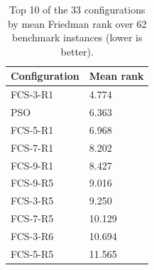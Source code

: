 \begin{table}[h]
\centering
\caption{Top 10 of the 33 configurations by mean Friedman rank over 62 benchmark instances (lower is better).}
\label{tab:top_configs}
\begin{tabular}{ll}
\toprule
Configuration & Mean rank \\
\midrule
FCS-3-R1 & 4.774 \\
PSO & 6.363 \\
FCS-5-R1 & 6.968 \\
FCS-7-R1 & 8.202 \\
FCS-9-R1 & 8.427 \\
FCS-9-R5 & 9.016 \\
FCS-3-R5 & 9.250 \\
FCS-7-R5 & 10.129 \\
FCS-3-R6 & 10.694 \\
FCS-5-R5 & 11.565 \\
\bottomrule
\end{tabular}
\end{table}
